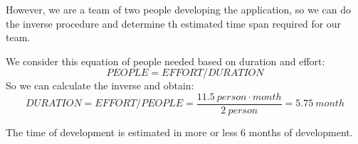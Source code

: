 \documentclass[a4paper]{scrreprt}
\begin{document}
However, we are a team of two people developing the application, so we can do the inverse procedure and determine th estimated time span required for our team.

We consider this equation of people needed based on duration and effort:
\[PEOPLE = EFFORT / DURATION\]
So we can calculate the inverse and obtain:
\[DURATION = EFFORT / PEOPLE = \frac{11.5\ person\cdot month}{2\ person} = 5.75\ month\]

The time of development is estimated in more or less 6 months of development.

%
%
\end{document}
